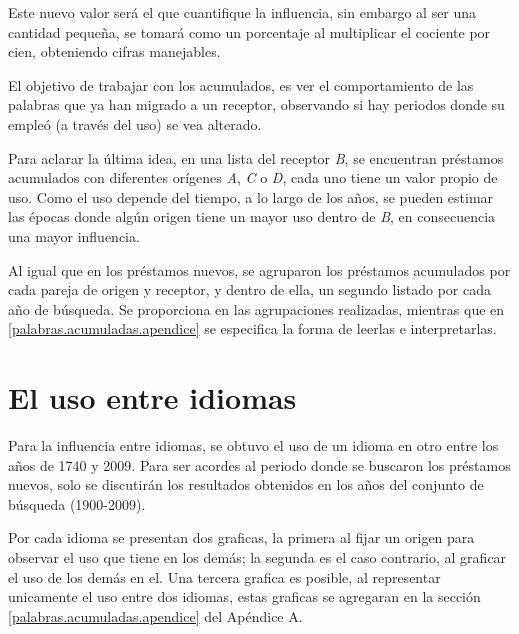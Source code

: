 \begin{enumerate}
	Este  nuevo valor será el que cuantifique la influencia, sin embargo al ser una cantidad pequeña, se tomará como un porcentaje al multiplicar el cociente por cien, obteniendo cifras manejables. 
	
	
	
\end{enumerate}

El objetivo de trabajar con los acumulados, es ver el comportamiento de las palabras que ya han migrado a un receptor, observando si hay periodos donde su empleó (a través del uso) se vea alterado. 

Para aclarar la última idea, en una lista del receptor \textit{B}, se encuentran  préstamos acumulados con diferentes orígenes \textit{A}, \textit{C} o \textit{D}, cada uno tiene un valor propio de uso. Como el uso depende del tiempo, a lo largo de los años, se pueden estimar las épocas donde algún origen tiene un mayor uso dentro de \textit{B},  en consecuencia una mayor influencia. 

Al igual que en los préstamos nuevos,  se agruparon los préstamos acumulados por cada pareja de origen y receptor,  y dentro de ella, un segundo listado por cada año de búsqueda.  Se proporciona en \cite{prestamos_acumulados} las agrupaciones realizadas, mientras que en \ref{palabras.acumuladas.apendice} se especifica la forma de leerlas e interpretarlas. 



\section {El uso entre idiomas} 

Para la influencia entre idiomas, se obtuvo el uso de un idioma en otro entre los años de 1740 y 2009. Para ser acordes al periodo donde se buscaron los préstamos nuevos, solo se discutirán los resultados obtenidos en los años del conjunto de búsqueda (1900-2009).


Por cada idioma se presentan dos graficas, la primera al fijar un origen para observar el uso que tiene en los demás; la segunda es el caso contrario,  al graficar el uso de los demás en el.  Una tercera grafica es posible, al representar unicamente el uso entre dos idiomas, estas graficas se agregaran en la sección \ref{palabras.acumuladas.apendice} del Apéndice A.

